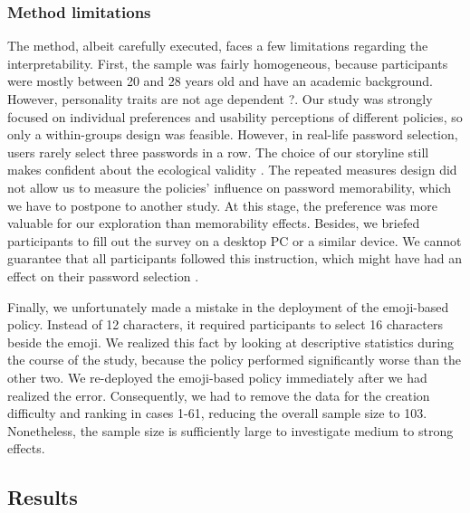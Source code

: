 \subsubsection{Method limitations}
The method, albeit carefully executed, faces a few limitations regarding the interpretability. First, the sample was fairly homogeneous, because participants were mostly between 20 and 28 years old and have an academic background. However, personality traits are not age dependent \ar?. Our study was strongly focused on individual preferences and usability perceptions of different policies, so only a within-groups design was feasible. However, in real-life password selection, users rarely select three passwords in a row. The choice of our storyline still makes confident about the ecological validity \cite{Fahl2013EcologicalValidityPasswordStudy}. The repeated measures design did not allow us to measure the policies' influence on password memorability, which we have to postpone to another study. At this stage, the preference was more valuable for our exploration than memorability effects. Besides, we briefed participants to fill out the survey on a desktop PC or a similar device. We cannot guarantee that all participants followed this instruction, which might have had an effect on their password selection \cite{Melicher2016UsabilityMobileTextPasswords}. 

Finally, we unfortunately made a mistake in the deployment of the emoji-based policy. Instead of 12 characters, it required participants to select 16 characters beside the emoji. We realized this fact by looking at descriptive statistics during the course of the study, because the policy performed significantly worse than the other two. We re-deployed the emoji-based policy immediately after we had realized the error. Consequently, we had to remove the data for the creation difficulty and ranking in cases 1-61, reducing the overall sample size to 103. Nonetheless, the sample size is sufficiently large to investigate medium to strong effects. 


\subsection{Results}


